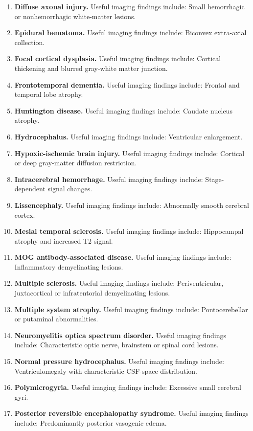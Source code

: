 \begin{enumerate}[leftmargin=*,itemsep=0.45em,topsep=0.4em]
\item \textbf{Diffuse axonal injury.} Useful imaging findings include: Small hemorrhagic or nonhemorrhagic white-matter lesions.
\item \textbf{Epidural hematoma.} Useful imaging findings include: Biconvex extra-axial collection.
\item \textbf{Focal cortical dysplasia.} Useful imaging findings include: Cortical thickening and blurred gray-white matter junction.
\item \textbf{Frontotemporal dementia.} Useful imaging findings include: Frontal and temporal lobe atrophy.
\item \textbf{Huntington disease.} Useful imaging findings include: Caudate nucleus atrophy.
\item \textbf{Hydrocephalus.} Useful imaging findings include: Ventricular enlargement.
\item \textbf{Hypoxic-ischemic brain injury.} Useful imaging findings include: Cortical or deep gray-matter diffusion restriction.
\item \textbf{Intracerebral hemorrhage.} Useful imaging findings include: Stage-dependent signal changes.
\item \textbf{Lissencephaly.} Useful imaging findings include: Abnormally smooth cerebral cortex.
\item \textbf{Mesial temporal sclerosis.} Useful imaging findings include: Hippocampal atrophy and increased T2 signal.
\item \textbf{MOG antibody-associated disease.} Useful imaging findings include: Inflammatory demyelinating lesions.
\item \textbf{Multiple sclerosis.} Useful imaging findings include: Periventricular, juxtacortical or infratentorial demyelinating lesions.
\item \textbf{Multiple system atrophy.} Useful imaging findings include: Pontocerebellar or putaminal abnormalities.
\item \textbf{Neuromyelitis optica spectrum disorder.} Useful imaging findings include: Characteristic optic nerve, brainstem or spinal cord lesions.
\item \textbf{Normal pressure hydrocephalus.} Useful imaging findings include: Ventriculomegaly with characteristic CSF-space distribution.
\item \textbf{Polymicrogyria.} Useful imaging findings include: Excessive small cerebral gyri.
\item \textbf{Posterior reversible encephalopathy syndrome.} Useful imaging findings include: Predominantly posterior vasogenic edema.

\end{enumerate}
